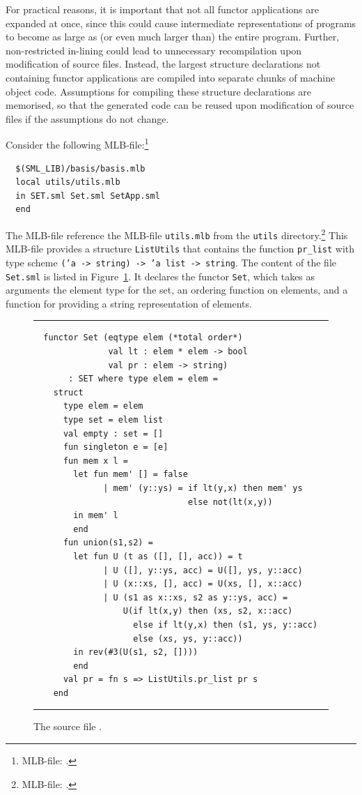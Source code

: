 \documentclass[12pt]{book}
\begin{document}
For practical reasons, it is important that not all functor
applications are expanded at once, since this could cause intermediate
representations of programs to become as large as (or even much larger
than) the entire program. Further, non-restricted in-lining could lead
to unnecessary recompilation upon modification of source files.
Instead, the largest structure declarations not containing functor
applications are compiled into separate chunks of machine object code.
Assumptions for compiling these structure declarations are memorised,
so that the generated code can be reused upon modification of source
files if the assumptions do not change.

Consider the following MLB-file:\footnote{MLB-file:
  .}
\begin{verbatim}
  $(SML_LIB)/basis/basis.mlb
  local utils/utils.mlb
  in SET.sml Set.sml SetApp.sml
  end
\end{verbatim}
The MLB-file reference the MLB-file {\tt utils.mlb} from the {\tt utils}
directory.\footnote{MLB-file: .} This
MLB-file provides a structure {\tt ListUtils} that contains the
function {\tt pr\_list} with type scheme {\tt ('a -> string) -> 'a
  list -> string}. The content of the file {\tt Set.sml} is listed in
Figure~\ref{Set.fig}. It declares the functor {\tt Set}, which takes
as arguments the element type for the set, an ordering function on
elements, and a function for providing a string representation of
elements.
\begin{figure}[ht]
\hrule \medskip
\begin{verbatim}
  functor Set (eqtype elem (*total order*)
               val lt : elem * elem -> bool
               val pr : elem -> string)
       : SET where type elem = elem =
    struct
      type elem = elem
      type set = elem list
      val empty : set = []
      fun singleton e = [e]
      fun mem x l =
        let fun mem' [] = false
              | mem' (y::ys) = if lt(y,x) then mem' ys
                               else not(lt(x,y))
        in mem' l
        end
      fun union(s1,s2) =
        let fun U (t as ([], [], acc)) = t
              | U ([], y::ys, acc) = U([], ys, y::acc)
              | U (x::xs, [], acc) = U(xs, [], x::acc)
              | U (s1 as x::xs, s2 as y::ys, acc) =
                  U(if lt(x,y) then (xs, s2, x::acc)
                    else if lt(y,x) then (s1, ys, y::acc)
                    else (xs, ys, y::acc))
        in rev(#3(U(s1, s2, [])))
        end
      val pr = fn s => ListUtils.pr_list pr s
    end
\end{verbatim}
\caption{The source file .}
\medskip \hrule \label{Set.fig}
\end{figure}
\end{document}
